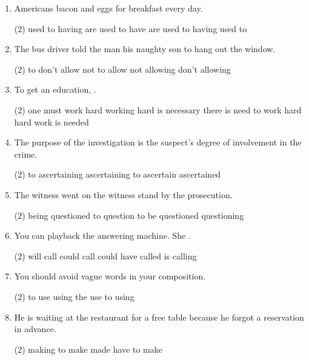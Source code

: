 \begin{enumerate}
\item Americans \ttu bacon and eggs for breakfast every day.
  \begin{tasks}(2)
    \task used to having
    \task are used to have
    \task are used to having
    \task used to
  \end{tasks}

\item The bus driver told the man \ttu his naughty son to hang out the window.
  \begin{tasks}(2)
    \task to don't allow
    \task not to allow
    \task not allowing
    \task don't allowing
  \end{tasks}

\item To get an education, \ttu.
  \begin{tasks}(2)
    \task one must work hard
    \task working hard is necessary
    \task there is need to work hard
    \task hard work is needed
  \end{tasks}

\item The purpose of the investigation is \ttu the suspect's degree of involvement in the crime.
  \begin{tasks}(2)
    \task to ascertaining
    \task ascertaining
    \task to ascertain
    \task ascertained
  \end{tasks}

\item The witness went on the witness stand \ttu by the prosecution.
  \begin{tasks}(2)
    \task being questioned
    \task to question
    \task to be questioned
    \task questioning
  \end{tasks}

\item You can playback the answering machine. She \ttu.
  \begin{tasks}(2)
    \task will call
    \task could call
    \task could have called
    \task is calling
  \end{tasks}

\item You should avoid \ttu vague words in your composition.
  \begin{tasks}(2)
    \task to use
    \task using
    \task the use
    \task to using
  \end{tasks}

\item He is waiting at the restaurant for a free table because he forgot \ttu a reservation in advance.
  \begin{tasks}(2)
    \task making
    \task to make
    \task made
    \task have to make
  \end{tasks}


\end{enumerate}
